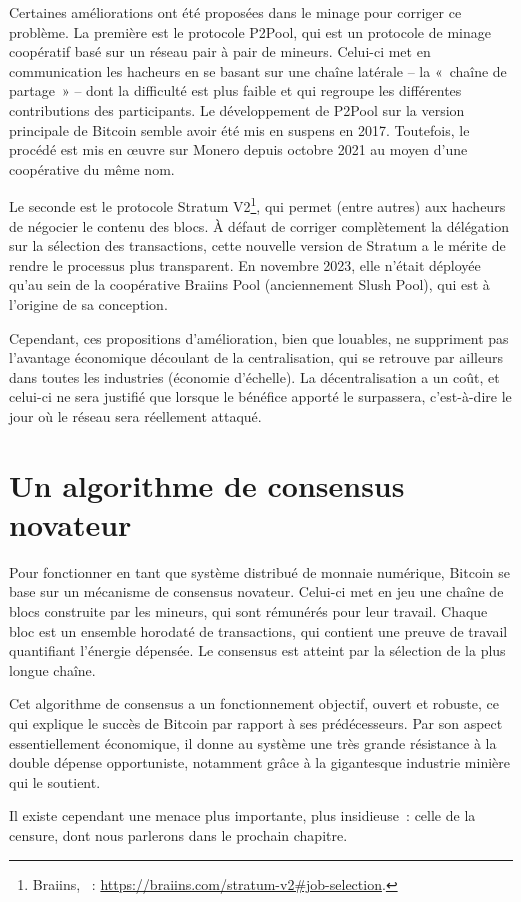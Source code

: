 Certaines améliorations ont été proposées dans le minage pour corriger ce problème. La première est le protocole P2Pool, qui est un protocole de minage coopératif basé sur un réseau pair à pair de mineurs. Celui-ci met en communication les hacheurs en se basant sur une chaîne latérale -- la «~chaîne de partage~» -- dont la difficulté est plus faible et qui regroupe les différentes contributions des participants. Le développement de P2Pool sur la version principale de Bitcoin semble avoir été mis en suspens en 2017. Toutefois, le procédé est mis en œuvre sur Monero depuis octobre 2021 au moyen d'une coopérative du même nom.

Le seconde est le protocole Stratum V2\footnote{Braiins, ~: \url{https://braiins.com/stratum-v2\#job-selection}.}, qui permet (entre autres) aux hacheurs de négocier le contenu des blocs. À défaut de corriger complètement la délégation sur la sélection des transactions, cette nouvelle version de Stratum a le mérite de rendre le processus plus transparent. En novembre 2023, elle n'était déployée qu'au sein de la coopérative Braiins Pool (anciennement Slush Pool), qui est à l'origine de sa conception.

Cependant, ces propositions d'amélioration, bien que louables, ne suppriment pas l'avantage économique découlant de la centralisation, qui se retrouve par ailleurs dans toutes les industries (économie d'échelle). La décentralisation a un coût, et celui-ci ne sera justifié que lorsque le bénéfice apporté le surpassera, c'est-à-dire le jour où le réseau sera réellement attaqué.

\section*{Un algorithme de consensus novateur}

Pour fonctionner en tant que système distribué de monnaie numérique, Bitcoin se base sur un mécanisme de consensus novateur. Celui-ci met en jeu une chaîne de blocs construite par les mineurs, qui sont rémunérés pour leur travail. Chaque bloc est un ensemble horodaté de transactions, qui contient une preuve de travail quantifiant l'énergie dépensée. Le consensus est atteint par la sélection de la plus longue chaîne.

Cet algorithme de consensus a un fonctionnement objectif, ouvert et robuste, ce qui explique le succès de Bitcoin par rapport à ses prédécesseurs. Par son aspect essentiellement économique, il donne au système une très grande résistance à la double dépense opportuniste, notamment grâce à la gigantesque industrie minière qui le soutient.

Il existe cependant une menace plus importante, plus insidieuse~: celle de la censure, dont nous parlerons dans le prochain chapitre.
